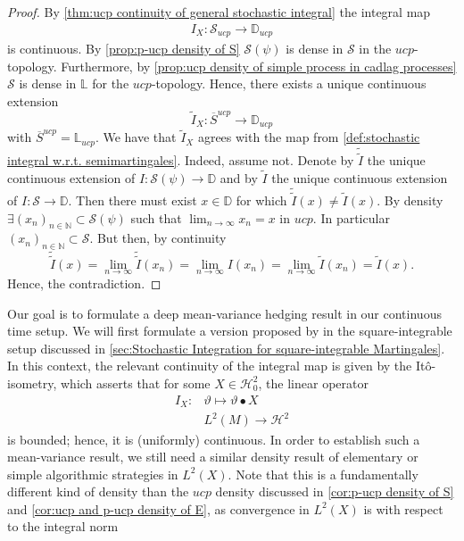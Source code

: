 \documentclass[11pt,a4paper,twoside,openany]{report}
\theoremstyle{plain} %
\theoremstyle{definition} %
\theoremstyle{remark} %
\let\parencite\authnumparencite
\begin{document}
\begin{proof}
    By \cref{thm:ucp continuity of general stochastic integral} the integral map
    \begin{align}
     I_X:\mathcal{S}_{ucp}\to\mathbb{D}_{ucp}   
    \end{align}
    is continuous. By \cref{prop:p-ucp density of S} \(\mathcal{S}(\psi)\) is dense in \(\mathcal{S}\) in the \(ucp\)-topology. Furthermore, by \cref{prop:ucp density of simple process in cadlag processes} \(\mathcal{S}\) is dense in \(\mathbb{L}\) for the \(ucp\)-topology. Hence, there exists a unique continuous extension 
    \begin{equation}
        \tilde{I}_X:\overline{S}^{ucp}\to\mathbb{D}_{ucp}
    \end{equation} 
    with \(\overline{S}^{ucp}=\mathbb{L}_{ucp}\). We have that \(\tilde{I}_X\) agrees with the map from \cref{def:stochastic integral w.r.t. semimartingales}. Indeed, assume not. Denote by \(\tilde{\tilde{I}}\) the unique continuous extension of \(I:\mathcal{S}(\psi)\to\mathbb{D}\) and by \(\tilde{I}\) the unique continuous extension of \(I:\mathcal{S}\to\mathbb{D}\). Then there must exist \(x\in\mathbb{D}\) for which \(\tilde{\tilde{I}}(x)\neq\tilde{I}(x)\). By density \(\exists(x_n)_{n\in\mathbb{N}}\subset\mathcal{S}(\psi)\) such that \(\lim_{n\to\infty}x_n=x\) in \(ucp\). In particular \((x_n)_{n\in\mathbb{N}}\subset\mathcal{S}\). But then, by continuity
    \begin{equation}
        \tilde{\tilde{I}}(x)=\lim_{n\to\infty}\tilde{\tilde{I}}(x_n)=\lim_{n\to\infty}I(x_n)=\lim_{n\to\infty}\tilde{I}(x_n)=\tilde{I}(x).
    \end{equation}
    Hence, the contradiction. 
\end{proof}
Our goal is to formulate a deep mean-variance hedging result in our continuous time setup. We will first formulate a version proposed by \parencite{Arandjelovic2025} in the square-integrable setup discussed in \cref{sec:Stochastic Integration for square-integrable Martingales}. In this context, the relevant continuity of the integral map is given by the Itô-isometry, which asserts that for some \(X\in\mathcal{H}_0^2\), the linear operator
\begin{align*}
    I_X:& \vartheta\mapsto \vartheta\bullet X\\
    &L^2(M)\to \mathcal{H}^2
\end{align*}
is bounded; hence, it is (uniformly) continuous. In order to establish such a mean-variance result, we still need a similar density result of elementary or simple algorithmic strategies in \(L^2(X)\). Note that this is a fundamentally different kind of density than the \(ucp\) density discussed in \cref{cor:p-ucp density of S} and \cref{cor:ucp and p-ucp density of E}, as convergence in \(L^2(X)\) is with respect to the integral norm 
\end{document}
